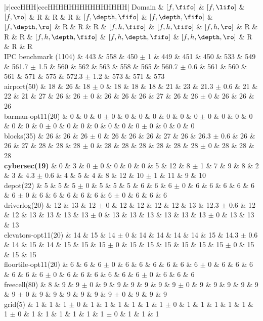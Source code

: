 \begin{center}
\begin{tabular}{|r|cccHHH|cccHHHHHHHHHHHHHHH|}
\hline
Domain & $[f,\fifo]$ & $[f,\lifo]$ & $[f,\ro]$ & R & R & R & $[f,\depth,\fifo]$ & $[f,\depth,\fifo]$ & $[f,\depth,\ro]$ & R & R & R & $[f,h,\fifo]$ & $[f,h,\fifo]$ & $[f,h,\ro]$ & R & R & R & $[f,h,\depth,\fifo]$ & $[f,h,\depth,\fifo]$ & $[f,h,\depth,\ro]$ & R & R & R\\
\hline
IPC benchmark (1104) & 443 & 558 & 450 $\pm$ 1 & 449 & 451 & 450 & 533 & 549 & 561.7 $\pm$ 1.5 & 560 & 562 & 563 & 558 & 565 & 560.7 $\pm$ 0.6 & 561 & 560 & 561 & 571 & 575 & 572.3 $\pm$ 1.2 & 573 & 571 & 573\\
\hline
airport(50) & 18 & 26 & 18 $\pm$ 0 & 18 & 18 & 18 & 21 & 23 & 21.3 $\pm$ 0.6 & 21 & 22 & 21 & 27 & 26 & 26 $\pm$ 0 & 26 & 26 & 26 & 27 & 26 & 26 $\pm$ 0 & 26 & 26 & 26\\
barman-opt11(20) & 0 & 0 & 0 $\pm$ 0 & 0 & 0 & 0 & 0 & 0 & 0 $\pm$ 0 & 0 & 0 & 0 & 0 & 0 & 0 $\pm$ 0 & 0 & 0 & 0 & 0 & 0 & 0 $\pm$ 0 & 0 & 0 & 0\\
blocks(35) & 26 & 26 & 26 $\pm$ 0 & 26 & 26 & 26 & 27 & 26 & 26.3 $\pm$ 0.6 & 26 & 26 & 27 & 28 & 28 & 28 $\pm$ 0 & 28 & 28 & 28 & 28 & 28 & 28 $\pm$ 0 & 28 & 28 & 28\\
\textbf{cybersec(19)} & 0 & 3 & 0 $\pm$ 0 & 0 & 0 & 0 & 5 & 12 & 8 $\pm$ 1 & 7 & 9 & 8 & 2 & 3 & 4.3 $\pm$ 0.6 & 4 & 5 & 4 & 8 & 12 & 10 $\pm$ 1 & 11 & 9 & 10\\
depot(22) & 5 & 5 & 5 $\pm$ 0 & 5 & 5 & 5 & 6 & 6 & 6 $\pm$ 0 & 6 & 6 & 6 & 6 & 6 & 6 $\pm$ 0 & 6 & 6 & 6 & 6 & 6 & 6 $\pm$ 0 & 6 & 6 & 6\\
driverlog(20) & 12 & 13 & 12 $\pm$ 0 & 12 & 12 & 12 & 12 & 13 & 12.3 $\pm$ 0.6 & 12 & 12 & 13 & 13 & 13 & 13 $\pm$ 0 & 13 & 13 & 13 & 13 & 13 & 13 $\pm$ 0 & 13 & 13 & 13\\
elevators-opt11(20) & 14 & 15 & 14 $\pm$ 0 & 14 & 14 & 14 & 14 & 15 & 14.3 $\pm$ 0.6 & 14 & 15 & 14 & 15 & 15 & 15 $\pm$ 0 & 15 & 15 & 15 & 15 & 15 & 15 $\pm$ 0 & 15 & 15 & 15\\
floortile-opt11(20) & 6 & 6 & 6 $\pm$ 0 & 6 & 6 & 6 & 6 & 6 & 6 $\pm$ 0 & 6 & 6 & 6 & 6 & 6 & 6 $\pm$ 0 & 6 & 6 & 6 & 6 & 6 & 6 $\pm$ 0 & 6 & 6 & 6\\
freecell(80) & 8 & 9 & 9 $\pm$ 0 & 9 & 9 & 9 & 9 & 9 & 9 $\pm$ 0 & 9 & 9 & 9 & 9 & 9 & 9 $\pm$ 0 & 9 & 9 & 9 & 9 & 9 & 9 $\pm$ 0 & 9 & 9 & 9\\
grid(5) & 1 & 1 & 1 $\pm$ 0 & 1 & 1 & 1 & 1 & 1 & 1 $\pm$ 0 & 1 & 1 & 1 & 1 & 1 & 1 $\pm$ 0 & 1 & 1 & 1 & 1 & 1 & 1 $\pm$ 0 & 1 & 1 & 1\\

\end{tabular}
\end{center}
